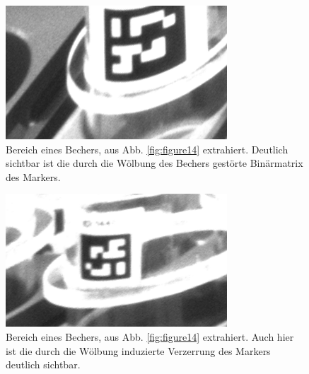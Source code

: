    \begin{figure}
        \caption[Bild aus der Lagerzelle nach der Rektifizierung und Zuschnitt auf einen Bereich eines Bechers]
        {\small Bereich eines Bechers, aus Abb. \ref{fig:figure14} extrahiert. Deutlich sichtbar ist die durch die Wölbung des Bechers gestörte Binärmatrix des Markers.}\label{fig:figure17}
        \includegraphics[width = \textwidth/3]{Bilder/cup17.png}
        \centering
    \end{figure}

    \begin{figure}
        \caption[Bild aus der Lagerzelle nach der Rektifizierung und Zuschnitt auf einen Bereich eines Bechers]
        {\small Bereich eines Bechers, aus Abb. \ref{fig:figure14} extrahiert. Auch hier ist die durch die Wölbung induzierte Verzerrung des Markers deutlich sichtbar.}\label{fig:figure20}
        \includegraphics[width = \textwidth/3]{Bilder/cup2.png}
        \centering
    \end{figure}

